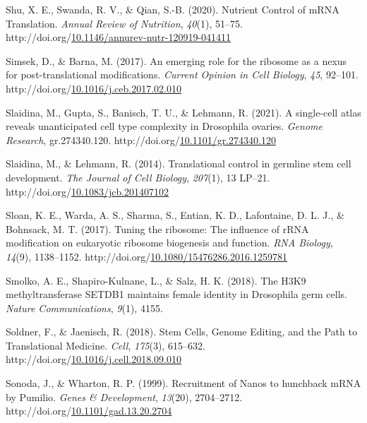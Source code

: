 \documentclass[12pt,oneside]{reedthesis}
\newlength{\cslhangindent}
\newenvironment{CSLReferences}[2] %
 {%
  \setlength{\parindent}{0pt}
  \ifodd #1 \everypar{\setlength{\hangindent}{\cslhangindent}}\ignorespaces\fi
  \ifnum #2 > 0
  \setlength{\parskip}{#2\baselineskip}
  \fi
 }%
 {}
\begin{document}
\begin{CSLReferences}{1}{0}
\leavevmode{}%
Shu, X. E., Swanda, R. V., \& Qian, S.-B. (2020). Nutrient {Control} of {mRNA Translation}. \emph{Annual Review of Nutrition}, \emph{40}(1), 51--75. http://doi.org/\href{https://doi.org/10.1146/annurev-nutr-120919-041411}{10.1146/annurev-nutr-120919-041411}

\leavevmode{}%
Simsek, D., \& Barna, M. (2017). An emerging role for the ribosome as a nexus for post-translational modifications. \emph{Current Opinion in Cell Biology}, \emph{45}, 92--101. http://doi.org/\href{https://doi.org/10.1016/j.ceb.2017.02.010}{10.1016/j.ceb.2017.02.010}

\leavevmode{}%
Slaidina, M., Gupta, S., Banisch, T. U., \& Lehmann, R. (2021). A single-cell atlas reveals unanticipated cell type complexity in {Drosophila} ovaries. \emph{Genome Research}, gr.274340.120. http://doi.org/\href{https://doi.org/10.1101/gr.274340.120}{10.1101/gr.274340.120}

\leavevmode{}%
Slaidina, M., \& Lehmann, R. (2014). Translational control in germline stem cell development. \emph{The Journal of Cell Biology}, \emph{207}(1), 13 LP--21. http://doi.org/\href{https://doi.org/10.1083/jcb.201407102}{10.1083/jcb.201407102}

\leavevmode{}%
Sloan, K. E., Warda, A. S., Sharma, S., Entian, K. D., Lafontaine, D. L. J., \& Bohnsack, M. T. (2017). Tuning the ribosome: {The} influence of {rRNA} modification on eukaryotic ribosome biogenesis and function. \emph{RNA Biology}, \emph{14}(9), 1138--1152. http://doi.org/\href{https://doi.org/10.1080/15476286.2016.1259781}{10.1080/15476286.2016.1259781}

\leavevmode{}%
Smolko, A. E., Shapiro-Kulnane, L., \& Salz, H. K. (2018). The {H3K9} methyltransferase {SETDB1} maintains female identity in {Drosophila} germ cells. \emph{Nature Communications}, \emph{9}(1), 4155.

\leavevmode{}%
Soldner, F., \& Jaenisch, R. (2018). Stem {Cells}, {Genome Editing}, and the {Path} to {Translational Medicine}. \emph{Cell}, \emph{175}(3), 615--632. http://doi.org/\href{https://doi.org/10.1016/j.cell.2018.09.010}{10.1016/j.cell.2018.09.010}

\leavevmode{}%
Sonoda, J., \& Wharton, R. P. (1999). Recruitment of {Nanos} to hunchback {mRNA} by {Pumilio}. \emph{Genes \& Development}, \emph{13}(20), 2704--2712. http://doi.org/\href{https://doi.org/10.1101/gad.13.20.2704}{10.1101/gad.13.20.2704}


\end{CSLReferences}
\end{document}
